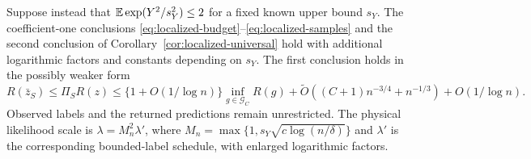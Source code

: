 \begin{corollary}
\label{cor:localized-subgaussian}
Suppose instead that $\mathbb E\exp(Y^2/s_Y^2)\le2$ for a fixed known upper
bound $s_Y$. The coefficient-one conclusions
\eqref{eq:localized-budget}--\eqref{eq:localized-samples} and the second
conclusion of Corollary~\ref{cor:localized-universal} hold with additional
logarithmic factors and constants depending on $s_Y$. The first
conclusion holds in the possibly weaker form
\[
 R(\bar z_S)\le\Pi_SR(z)
 \le\{1+O(1/\log n)\}\inf_{g\in\mathcal G_C}R(g)
       +\widetilde O((C+1)n^{-3/4}+n^{-1/3})+O(1/\log n).
\]
Observed labels and the returned predictions remain unrestricted.
The physical likelihood scale is $\lambda=M_n^2\lambda'$, where
$M_n=\max\{1,s_Y\sqrt{c\log(n/\delta)}\}$ and $\lambda'$ is the
corresponding bounded-label schedule, with enlarged logarithmic factors.
\end{corollary}

